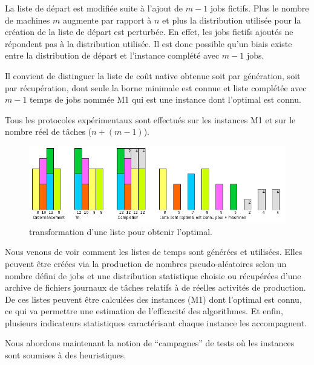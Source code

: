 \documentclass[a4paper,12pt]{report}
\theoremstyle{plain}				%
\theoremstyle{definition}				%
\begin{document}
La liste de départ est modifiée suite à l'ajout de $m-1$ jobs fictifs. 
Plus le nombre de machines $m$ augmente par rapport à $n$ et plus la distribution utilisée pour 
  la création de la liste de départ est perturbée. 
En effet, les jobs fictifs ajoutés ne répondent pas à la distribution utilisée. 
Il est donc possible qu'un biais existe entre la distribution de départ et l'instance complété avec $m-1$ jobs.

 
Il convient de distinguer la liste de coût native obtenue 
  soit par génération, 
  soit par récupération, 
  dont seule la borne minimale est connue  
  et liste complétée avec $m-1$ temps de jobs nommée M1 qui est une instance dont l'optimal est connu.
  
Tous les protocoles expérimentaux sont effectués sur les instances M1 et sur le nombre réel de 
  tâches ($n + (m-1)$).

\begin{figure}
{\centering
\includegraphics[width=\columnwidth]{maitriseOptimal.jpg}
\caption{transformation d'une liste pour obtenir l'optimal.}
\label{ex:maitriseOptimal}
\par}
\end{figure}

\bigskip
Nous venons de voir comment les listes de temps sont générées et utilisées. 
Elles peuvent être créées via la production de nombres pseudo-aléatoires selon un nombre 
  défini de jobs et une distribution statistique choisie 
  ou récupérées d'une archive de fichiers journaux de tâches relatifs à de réelles 
  activités de production.
De ces listes peuvent être calculées des instances (M1) dont l'optimal est connu, 
  ce qui va permettre une estimation de l'efficacité des algorithmes.
Et enfin, plusieurs indicateurs statistiques caractérisant chaque instance les accompagnent.

Nous abordons maintenant la notion de ``campagnes'' de tests où les instances sont soumises à des heuristiques.  

\end{document}

